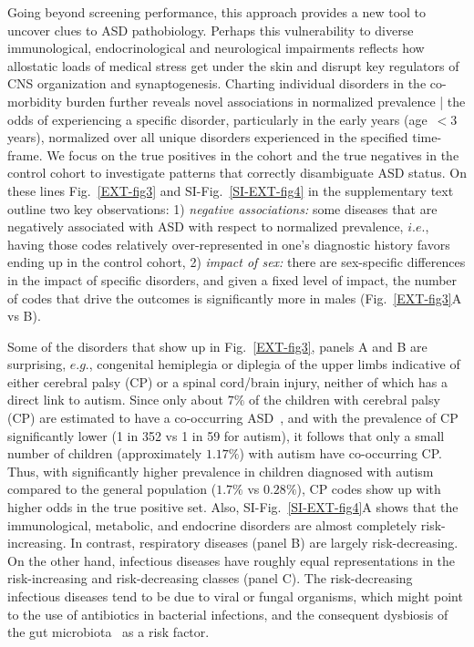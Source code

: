 \documentclass[3p,super,numbers,sort&compress,preprint,10pt]{elsarticle}
\begin{document}
Going beyond screening performance, this approach provides a new tool to uncover clues to ASD pathobiology. Perhaps this vulnerability to  diverse immunological, endocrinological  and neurological impairments reflects  how allostatic loads of  medical stress get under the skin and disrupt key regulators of  CNS  organization and  synaptogenesis. Charting individual disorders in the co-morbidity burden further reveals novel associations in normalized prevalence | the odds of experiencing a specific disorder, particularly in the early years (age~$<3$ years), normalized over all unique disorders experienced in the specified time-frame. We focus on  the true positives in the \treatment cohort and the true negatives in the control cohort to investigate  patterns that correctly disambiguate  ASD status. On these lines  Fig.~\ref{EXT-fig3} and SI-Fig.~\ref{SI-EXT-fig4}  in the supplementary text outline two key  observations: 1) \textit{negative associations:} some  diseases that are negatively associated with ASD  with respect to normalized prevalence, $i.e.$, having those codes relatively  over-represented  in one's diagnostic history favors ending up in the control cohort, 2) \textit{impact of sex:} there are sex-specific differences in the impact of specific disorders,  and given a fixed level of impact, the number of codes that drive the outcomes is significantly more in males (Fig.~\ref{EXT-fig3}A vs B).

Some of the disorders that show up in Fig.~\ref{EXT-fig3}, panels A and B are surprising, $e.g.$,  congenital hemiplegia or diplegia of the upper limbs indicative of either  cerebral palsy (CP) or a spinal cord/brain injury, neither of which has a direct  link to autism. Since only about $7\%$ of the children with  cerebral palsy (CP) are estimated to have a  co-occurring ASD~\cite{cdccp,christensen2014prevalence}, and with the prevalence of CP  significantly lower  (1 in 352 vs 1 in 59 for autism), it follows that  only a small number of children (approximately $1.17\%$) with autism have co-occurring CP. Thus, with significantly higher prevalence in children diagnosed with autism compared to the general population ($1.7\%$ vs $0.28\%$), CP codes show  up with higher odds in the true positive set. Also, SI-Fig.~\ref{SI-EXT-fig4}A shows that the immunological, metabolic, and endocrine disorders are almost completely risk-increasing. In contrast, respiratory diseases (panel B) are largely risk-decreasing. On the other hand, infectious diseases have roughly equal representations in the risk-increasing and risk-decreasing classes (panel C). The risk-decreasing infectious diseases tend to be due to viral or fungal organisms, which might point to the use of antibiotics in bacterial infections, and the consequent dysbiosis of the gut microbiota~\cite{pmid30823414,pmid27957319} as a risk factor.
\end{document}
